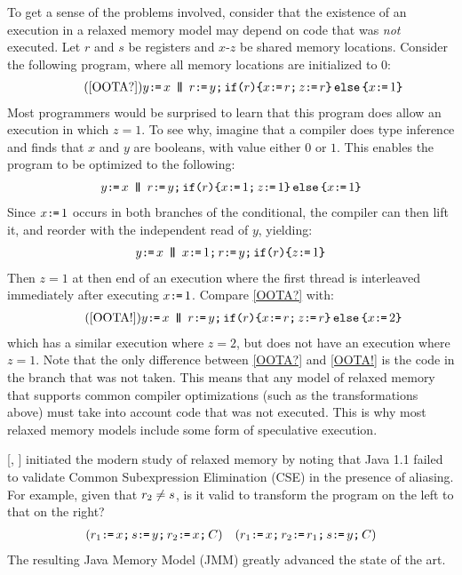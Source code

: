 To get a sense of the problems involved,
consider that the existence of an execution in a relaxed memory model may
depend on code that was \emph{not} executed. Let $r$ and $s$ be registers and
$x$-$z$ be shared memory locations.  Consider the following program, where
all memory locations are initialized to $0$:
\begin{gather}
  \tag{\ref{OOTA?}}
    y\GETS x
  \PAR
  r\GETS y\SEMI\IF{r}\THEN 
  x\GETS r\SEMI z\GETS r \ELSE x\GETS1 \FI
\end{gather}
Most programmers would be surprised to learn that this program does allow an
execution in which $z=1$. To see why, imagine that a compiler does type
inference and finds that $x$ and $y$ are booleans, with value either $0$ or
$1$.  This enables the program to be optimized to the following:
\begin{gather*}
    y\GETS x
  \PAR
  r\GETS y\SEMI\IF{r}\THEN 
  x\GETS 1\SEMI z\GETS 1 \ELSE x\GETS1 \FI
\end{gather*}
Since $x\texttt{:}\mkern-1mu\texttt{=}\,1$ occurs in both branches of the conditional, the compiler can
then lift it, and reorder with the independent read of $y$, yielding:
\begin{gather*}
    y\GETS x
  \PAR
  x\GETS1\SEMI
  r\GETS y\SEMI\IF{r}\THEN z\GETS 1 \FI
\end{gather*}
Then $z=1$ at then end of an execution where the first thread is interleaved
immediately after executing $x\texttt{:}\mkern-1mu\texttt{=}\,1$.  Compare \eqref{OOTA?} with:
\begin{gather}
  \tag{\ref{OOTA!}}
    y\GETS x
  \PAR
  r\GETS y\SEMI \IF{r}\THEN 
  x\GETS r\SEMI z\GETS r \ELSE x\GETS2 \FI
\end{gather}
which has a similar execution where $z=2$, but does not have an execution
where $z=1$. Note that the only difference between \eqref{OOTA?} and
\eqref{OOTA!} is the code in the branch that was not taken. This means that
any model of relaxed memory that supports common compiler optimizations (such
as the transformations above) must take into account code that was not
executed. This is why most relaxed memory models include some form of
speculative execution.



\citeauthor{DBLP:conf/java/Pugh99} [\citeyear{DBLP:conf/java/Pugh99},
] initiated the modern study of relaxed memory by noting that
Java 1.1 failed to validate Common Subexpression Elimination (CSE) in the
presence of aliasing. For example, given that $r_2\neq s$, is it valid
to transform the program on the left to that on the right?
\begin{align*}
  ({r_1\texttt{:}\mkern-1mu\texttt{=}\, x \texttt{;}\,\allowbreak
  s\texttt{:}\mkern-1mu\texttt{=}\, y \texttt{;}\,\allowbreak  
  r_2\texttt{:}\mkern-1mu\texttt{=}\, x\texttt{;}\,\allowbreak C})
&&
  ({r_1\texttt{:}\mkern-1mu\texttt{=}\, x \texttt{;}\,\allowbreak     
    r_2\texttt{:}\mkern-1mu\texttt{=}\, r_1\texttt{;}\,\allowbreak
    s\texttt{:}\mkern-1mu\texttt{=}\, y \texttt{;}\,\allowbreak C})
\end{align*}
The resulting Java Memory Model (JMM) \cite{Manson:2005:JMM:1047659.1040336}
greatly advanced the state of the art.


